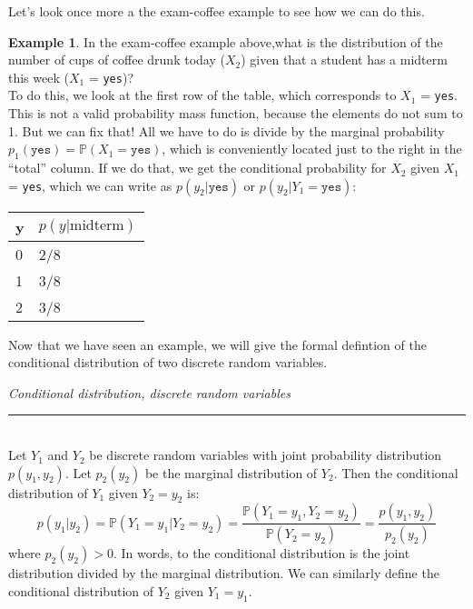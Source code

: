 \documentclass[12pt]{article}
\theoremstyle{definition}
\newtheorem*{example}{Example}
\theoremstyle{remark}
\def\P{{\mathbb P}}
\begin{document}
Let's look once more a the exam-coffee example to see how we can do this.

\begin{example}
In the exam-coffee example above,what is the distribution of the number of cups of coffee drunk today ($X_2$) given that a student has a midterm this week ($X_1$ = \texttt{yes})?\\

To do this, we look at the first row of the table, which corresponds to $X_1$ = \texttt{yes}. This is not a valid probability mass function, because the elements do not sum to 1. But we can fix that! All we have to do is divide by the marginal probability $p_1(\texttt{yes}) = \P(X_1 = \texttt{yes})$, which is conveniently located just to the right in the ``total'' column. If we do that, we get the conditional probability for $X_2$ given $X_1$ = \texttt{yes}, which we can write as $p(y_2 | \texttt{yes})$ or $p(y_2 | Y_1 = \texttt{yes})$:

\begin{table}[H]
\centering
\begin{tabular}{@{}ll@{}}
\toprule
y & $p(y | \text{midterm})$ \\ \midrule
0 & 2/8                                  \\
1 & 3/8                                  \\
2 & 3/8                                \\ \bottomrule
\end{tabular}
\end{table}
\end{example}

Now that we have seen an example, we will give the formal defintion of the conditional distribution of two discrete random variables.

\begin{framed}
\emph{Conditional distribution, discrete random variables}\\
  \rule{\dimexpr{}\fboxrule}{.1pt} \\
Let $Y_1$ and $Y_2$ be discrete random variables with joint probability distribution $p(y_1, y_2)$. Let $p_2(y_2)$ be the marginal distribution of $Y_2$. Then the conditional distribution of $Y_1$ given $Y_2 = y_2$ is:
\[
p(y_1|y_2) = \P(Y_1 = y_1|Y_2 = y_2) = \frac{\P(Y_1 = y_1, Y_2 = y_2)}{\P(Y_2 = y_2)} = \frac{p(y_1, y_2)}{p_2(y_2)}
\]
where $p_2(y_2) > 0$. In words, to the conditional distribution is the joint distribution divided by the marginal distribution. We can similarly define the conditional distribution of $Y_2$ given $Y_1 = y_1$.
\end{framed}
\end{document}
